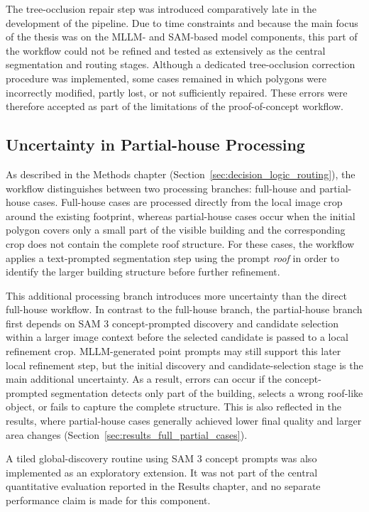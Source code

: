The tree-occlusion repair step was introduced comparatively late in the development of the pipeline. Due to time constraints and because the main focus of the thesis was on the MLLM- and SAM-based model components, this part of the workflow could not be refined and tested as extensively as the central segmentation and routing stages. Although a dedicated tree-occlusion correction procedure was implemented, some cases remained in which polygons were incorrectly modified, partly lost, or not sufficiently repaired. These errors were therefore accepted as part of the limitations of the proof-of-concept workflow.

\subsection{Uncertainty in Partial-house Processing}
\label{sec:partial_house_global_discovery_uncertainty}

As described in the Methods chapter (Section~\ref{sec:decision_logic_routing}), the workflow distinguishes between two processing branches: full-house and partial-house cases. Full-house cases are processed directly from the local image crop around the existing footprint, whereas partial-house cases occur when the initial polygon covers only a small part of the visible building and the corresponding crop does not contain the complete roof structure. For these cases, the workflow applies a text-prompted segmentation step using the prompt \textit{roof} in order to identify the larger building structure before further refinement.

This additional processing branch introduces more uncertainty than the direct full-house workflow. In contrast to the full-house branch, the partial-house branch first depends on SAM 3 concept-prompted discovery and candidate selection within a larger image context before the selected candidate is passed to a local refinement crop. MLLM-generated point prompts may still support this later local refinement step, but the initial discovery and candidate-selection stage is the main additional uncertainty. As a result, errors can occur if the concept-prompted segmentation detects only part of the building, selects a wrong roof-like object, or fails to capture the complete structure. This is also reflected in the results, where partial-house cases generally achieved lower final quality and larger area changes (Section~\ref{sec:results_full_partial_cases}).

A tiled global-discovery routine using SAM 3 concept prompts was also implemented as an exploratory extension. It was not part of the central quantitative evaluation reported in the Results chapter, and no separate performance claim is made for this component.

